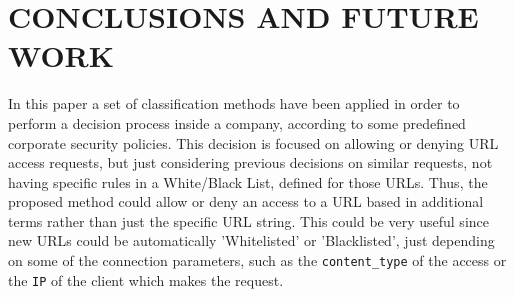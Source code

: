 \documentclass{llncs}
\begin{document}
% 
% 
% 
% 


%
\section{\uppercase{Conclusions and Future Work}}
\label{sec:conclusions}

\noindent In this paper a set of classification methods have been applied
in order to perform a decision process inside a company, according to
some predefined corporate security policies. 
This decision is focused on allowing or denying URL access requests, but just considering previous decisions on similar requests, not having specific rules in a White/Black List, defined for those URLs. Thus, the proposed method could allow or deny an access to a URL based in additional terms rather than just the specific URL string. This could be very useful since new URLs could be automatically 'Whitelisted' or 'Blacklisted', just depending on some of the connection parameters, such as the \texttt{content\_type} of the access or the \texttt{IP} of the client which makes the request.
\end{document}

